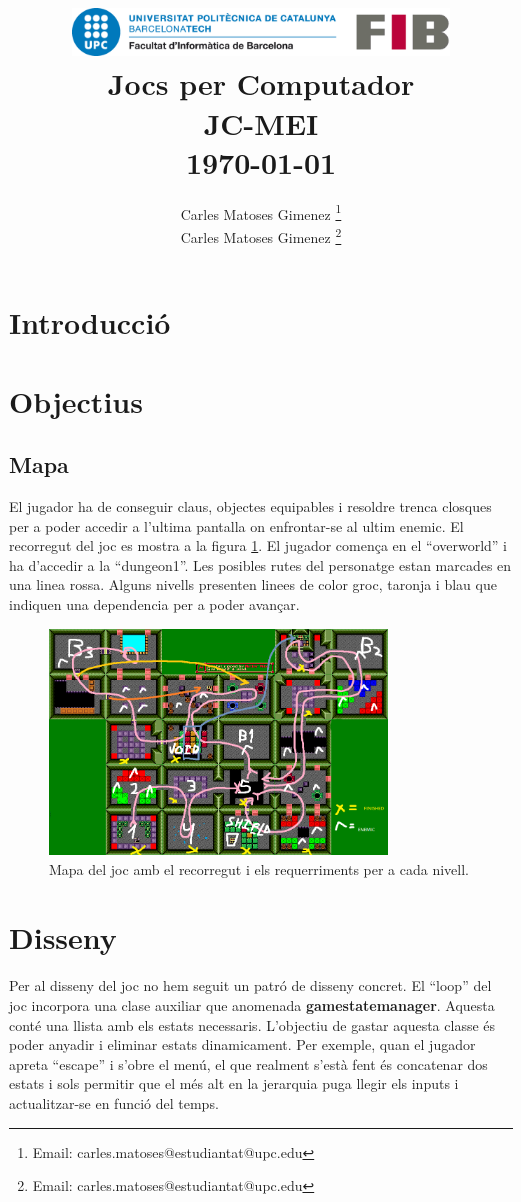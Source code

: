 \documentclass[a4paper,12pt]{article}
\title{
    \vspace{2cm} %
    \includegraphics[width=0.75\textwidth]{fib.png} \\ %
    \vspace{1cm} %
    \textbf{\Huge Jocs per Computador} \\
    \vspace{1cm} %
    \large JC-MEI \\
    \vspace{0.5cm} %
    \large \today
}
\author{
Carles Matoses Gimenez
    \thanks{
    Email: carles.matoses@estudiantat@upc.edu}\\
Carles Matoses Gimenez
    \thanks{
    Email: carles.matoses@estudiantat@upc.edu}\\
}
\date{
}
\begin{document}
\maketitle
\thispagestyle{empty}
\newpage

\setcounter{page}{1}  %
\tableofcontents
\newpage

\section{Introducció}

\section{Objectius}
\subsection{Mapa}
El jugador ha de conseguir claus, objectes equipables i resoldre trenca closques per a poder accedir a l'ultima pantalla on enfrontar-se al ultim enemic. El recorregut del joc es mostra a la figura \ref{fig:mapa}. El jugador comença en el ``overworld'' i ha d'accedir a la ``dungeon1''. Les posibles rutes del personatge estan marcades en una linea rossa. Alguns nivells presenten linees de color groc, taronja i blau que indiquen una dependencia per a poder avançar.
\begin{figure}[ht!]
    \centering
    \includegraphics[width=0.8\textwidth]{../imgs/recorregut.png} %
    \caption{Mapa del joc amb el recorregut i els requerriments per a  cada nivell.}
    \label{fig:mapa}
\end{figure}

\section{Disseny}
Per al disseny del joc no hem seguit un patró de disseny concret. El ``loop'' del joc incorpora una clase auxiliar que anomenada \textbf{gamestatemanager}. Aquesta conté una llista amb els estats necessaris. L'objectiu de gastar aquesta classe és poder anyadir i eliminar estats dinamicament. Per exemple, quan el jugador apreta ``escape'' i s'obre el menú, el que realment s'està fent és concatenar dos estats i sols permitir que el més alt en la jerarquia puga llegir els inputs i actualitzar-se en funció del temps. 
\end{document}
